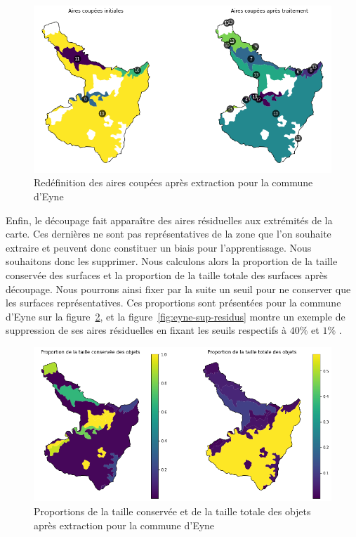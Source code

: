 \begin{figure}[!h]
    \centering
    \includegraphics[scale=0.5]{figures/eyne-redef-aires}
    \caption{Redéfinition des aires coupées après extraction pour la commune d'Eyne}
    \label{fig:eyne-redef-aire}
\end{figure}



Enfin, le découpage fait apparaître des aires résiduelles aux extrémités de la carte.
Ces dernières ne sont pas représentatives de la zone que l'on souhaite extraire et peuvent donc constituer un biais pour l'apprentissage.
Nous souhaitons donc les supprimer.
Nous calculons alors la proportion de la taille conservée des surfaces et la proportion de la taille totale des surfaces après découpage.
Nous pourrons ainsi fixer par la suite un seuil pour ne conserver que les surfaces représentatives.
Ces proportions sont présentées pour la commune d'Eyne sur la figure~\ref{fig:eyne-residus-prop}, et la figure~\ref{fig:eyne-sup-residus} montre un exemple de suppression de ses aires résiduelles en fixant les seuils respectifs à $40\%$ et $1\%$ .


\begin{figure}[!h]
    \centering
    \includegraphics[scale=0.5]{figures/eyne-residus-prop}
    \caption{Proportions de la taille conservée et de la taille totale des objets après extraction pour la commune d'Eyne}
    \label{fig:eyne-residus-prop}
\end{figure}


